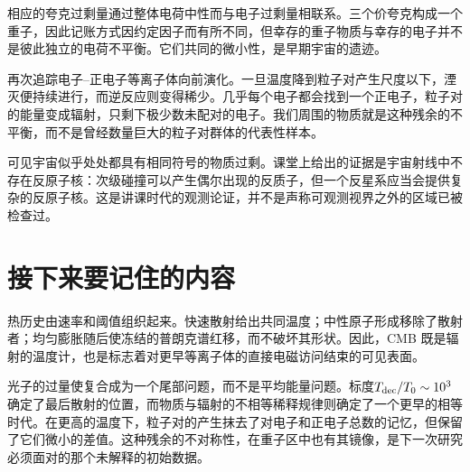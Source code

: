 相应的夸克过剩量通过整体电荷中性而与电子过剩量相联系。三个价夸克构成一个重子，因此记账方式因约定因子而有所不同，但幸存的重子物质与幸存的电子并不是彼此独立的电荷不平衡。它们共同的微小性，是早期宇宙的遗迹。

再次追踪电子--正电子等离子体向前演化。一旦温度降到粒子对产生尺度以下，湮灭便持续进行，而逆反应则变得稀少。几乎每个电子都会找到一个正电子，粒子对的能量变成辐射，只剩下极少数未配对的电子。我们周围的物质就是这种残余的不平衡，而不是曾经数量巨大的粒子对群体的代表性样本。

\begin{classroomqa}
\end{classroomqa}

可见宇宙似乎处处都具有相同符号的物质过剩。课堂上给出的证据是宇宙射线中不存在反原子核：次级碰撞可以产生偶尔出现的反质子，但一个反星系应当会提供复杂的反原子核。这是讲课时代的观测论证，并不是声称可观测视界之外的区域已被检查过。

\begin{classroomqa}
\end{classroomqa}

\begin{classroomqa}
\end{classroomqa}

\section{接下来要记住的内容}

热历史由速率和阈值组织起来。快速散射给出共同温度；中性原子形成移除了散射者；均匀膨胀随后使冻结的普朗克谱红移，而不破坏其形状。因此，CMB 既是辐射的温度计，也是标志着对更早等离子体的直接电磁访问结束的可见表面。

光子的过量使复合成为一个尾部问题，而不是平均能量问题。标度\(T_{\rm dec}/T_0\sim10^3\)确定了最后散射的位置，而物质与辐射的不相等稀释规律则确定了一个更早的相等时代。在更高的温度下，粒子对的产生抹去了对电子和正电子总数的记忆，但保留了它们微小的差值。这种残余的不对称性，在重子区中也有其镜像，是下一次研究必须面对的那个未解释的初始数据。